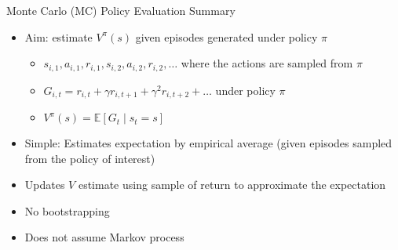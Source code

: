 \documentclass[aspectratio=169]{../latex_main/tntbeamer}  %
\begin{document}
\begin{frame}[c]{Monte Carlo (MC) Policy Evaluation Summary}
	
	\begin{itemize}
		\item Aim: estimate $V^\pi(s)$ given episodes generated under policy $\pi$
		\begin{itemize}
			\item $s_{i,1}, a_{i,1}, r_{i,1}, s_{i,2}, a_{i,2}, r_{i,2}, \ldots$ where the actions are sampled from $\pi$
			\item $G_{i,t} = r_{i,t} + \gamma r_{i,t+1} + \gamma^2 r_{i,t+2} + \ldots$ under policy $\pi$
			\item $V^\pi (s) = \mathbb{E}[G_t \mid s_t = s]$
		\end{itemize}
		\item Simple: Estimates expectation by empirical average (given episodes sampled from the policy of interest)
		\item Updates $V$ estimate using sample of return to approximate the expectation
		\item No bootstrapping
		\item Does not assume Markov process
	\end{itemize}
	
\end{frame}

\end{document}
